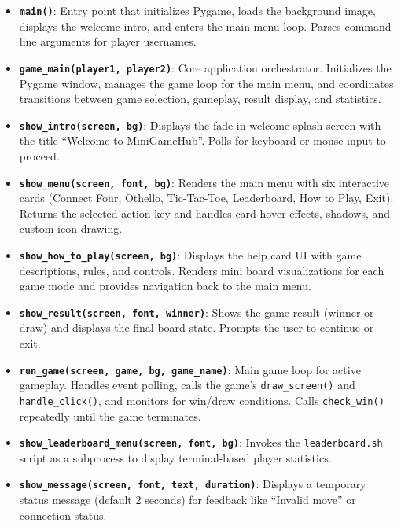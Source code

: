 \documentclass[12pt,a4paper]{article}
\begin{document}
\begin{itemize}
    \item \textbf{\texttt{main()}}: Entry point that initializes Pygame, loads the background image, displays the welcome intro, and enters the main menu loop. Parses command-line arguments for player usernames.
    
    \item \textbf{\texttt{game\_main(player1, player2)}}: Core application orchestrator. Initializes the Pygame window, manages the game loop for the main menu, and coordinates transitions between game selection, gameplay, result display, and statistics.
    
    \item \textbf{\texttt{show\_intro(screen, bg)}}: Displays the fade-in welcome splash screen with the title ``Welcome to MiniGameHub''. Polls for keyboard or mouse input to proceed.
    
    \item \textbf{\texttt{show\_menu(screen, font, bg)}}: Renders the main menu with six interactive cards (Connect Four, Othello, Tic-Tac-Toe, Leaderboard, How to Play, Exit). Returns the selected action key and handles card hover effects, shadows, and custom icon drawing.
    
    \item \textbf{\texttt{show\_how\_to\_play(screen, bg)}}: Displays the help card UI with game descriptions, rules, and controls. Renders mini board visualizations for each game mode and provides navigation back to the main menu.
    
    \item \textbf{\texttt{show\_result(screen, font, winner)}}: Shows the game result (winner or draw) and displays the final board state. Prompts the user to continue or exit.
    
    \item \textbf{\texttt{run\_game(screen, game, bg, game\_name)}}: Main game loop for active gameplay. Handles event polling, calls the game's \texttt{draw\_screen()} and \texttt{handle\_click()}, and monitors for win/draw conditions. Calls \texttt{check\_win()} repeatedly until the game terminates.
    
    \item \textbf{\texttt{show\_leaderboard\_menu(screen, font, bg)}}: Invokes the \texttt{leaderboard.sh} script as a subprocess to display terminal-based player statistics.
    
    \item \textbf{\texttt{show\_message(screen, font, text, duration)}}: Displays a temporary status message (default 2 seconds) for feedback like ``Invalid move'' or connection status.
    

\end{itemize}
\end{document}
